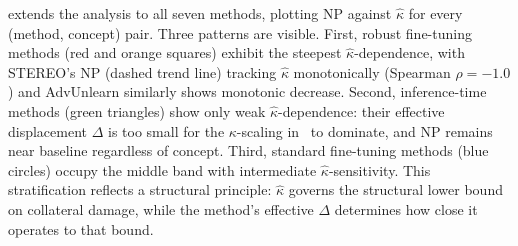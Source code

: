  extends the analysis to all seven methods, plotting NP against $\hat\kappa$ for every (method, concept) pair. 
Three patterns are visible. First, robust fine-tuning methods (red and orange squares) exhibit the steepest $\hat\kappa$-dependence, with STEREO's NP (dashed trend line) tracking $\hat\kappa$ monotonically (Spearman $\rho = -1.0$) and AdvUnlearn similarly shows monotonic decrease. Second, inference-time methods (green triangles) show only weak $\hat\kappa$-dependence: their effective displacement $\Delta$ is too small for the $\kappa$-scaling in~ to dominate, and NP remains near baseline regardless of concept. Third, standard fine-tuning methods (blue circles) occupy the middle band with intermediate $\hat\kappa$-sensitivity. This stratification reflects a structural principle: $\hat\kappa$ governs the structural lower bound on collateral damage, while the method's effective $\Delta$ determines how close it operates to that bound.

